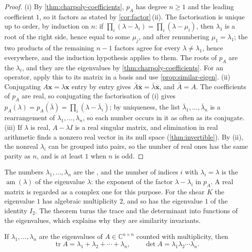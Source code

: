 \begin{proof}
(i) By \cref{thm:charpoly-coefficients}, $p_A$ has degree $n\ge1$ and the leading coefficient $1$, so it factors as stated by \cref{cor:factor}\,(ii). The factorisation is unique up to order, by induction on $n$: if $\prod_i(\lambda-\lambda_i)=\prod_i(\lambda-\mu_i)$, then $\lambda_1$ is a root of the right side, hence equal to some $\mu_j$, and after renumbering $\mu_1=\lambda_1$; the two products of the remaining $n-1$ factors agree for every $\lambda\ne\lambda_1$, hence everywhere, and the induction hypothesis applies to them. The roots of $p_A$ are the $\lambda_i$, and they are the eigenvalues by \cref{thm:charpoly-coefficients}. For an operator, apply this to its matrix in a basis and use \cref{prop:similar-eigen}. (ii) Conjugating $A\mathbf x=\lambda\mathbf x$ entry by entry gives $\bar A\bar{\mathbf x}=\bar\lambda\bar{\mathbf x}$, and $\bar A=A$. The coefficients of $p_A$ are real, so conjugating the factorisation of (i) gives $p_A(\lambda)=\overline{p_A(\bar\lambda)}=\prod_i(\lambda-\bar\lambda_i)$; by uniqueness, the list $\bar\lambda_1,\ldots,\bar\lambda_n$ is a rearrangement of $\lambda_1,\ldots,\lambda_n$, so each number occurs in it as often as its conjugate. (iii) If $\lambda$ is real, $A-\lambda I$ is a real singular matrix, and elimination in real arithmetic finds a nonzero real vector in its null space (\cref{thm:invertible}). By (ii), the nonreal $\lambda_i$ can be grouped into pairs, so the number of real ones has the same parity as $n$, and is at least $1$ when $n$ is odd.
\end{proof}

The numbers $\lambda_1,\ldots,\lambda_n$ are the , and the number of indices $i$ with $\lambda_i=\lambda$ is the  $\operatorname{am}(\lambda)$ of the eigenvalue $\lambda$: the exponent of the factor $\lambda-\lambda_i$ in $p_A$. A real matrix is regarded as a complex one for this purpose. For the shear $K$ the eigenvalue $1$ has algebraic multiplicity $2$, and so has the eigenvalue $1$ of the identity $I_2$. The theorem turns the trace and the determinant into functions of the eigenvalues, which explains why they are similarity invariants.

\begin{theorem}
\label{thm:trace-det-eigen}
If $\lambda_1,\ldots,\lambda_n$ are the eigenvalues of $A\in\mathbb C^{n\times n}$ counted with multiplicity, then
\[
\operatorname{tr}A=\lambda_1+\lambda_2+\cdots+\lambda_n,\qquad\det A=\lambda_1\lambda_2\cdots\lambda_n .
\]
\end{theorem}

